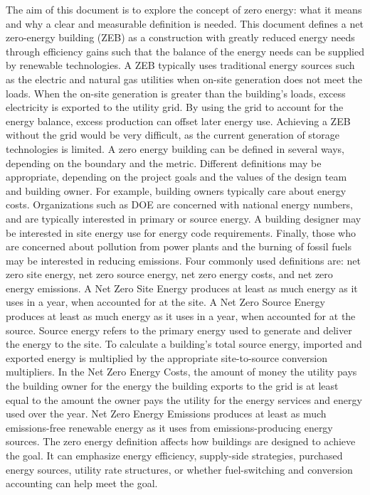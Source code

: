 The aim of this document is to explore the concept of zero energy: what it means and why a clear and measurable definition is needed. This document defines a net zero-energy building (ZEB) as a construction with greatly reduced energy needs through efficiency gains such that the balance of the energy needs can be supplied by renewable technologies. A ZEB typically uses traditional energy sources such as the electric and natural gas utilities when on-site generation does not meet the loads. When the on-site generation is greater than the building’s loads, excess electricity is exported to the utility grid. By using the grid to account for the energy balance, excess production can offset later energy use. Achieving a ZEB without the grid would be very difficult, as the current generation of storage technologies is limited. A zero energy building can be defined in several ways, depending on the boundary and the metric. Different definitions may be appropriate, depending on the project goals and the values of the design team and building owner. For example, building owners typically care about energy costs. Organizations such as DOE are concerned with national energy numbers, and are typically interested in primary or source energy. A building designer may be interested in site energy use for energy code requirements. Finally, those who are concerned about pollution from power plants and the burning of fossil fuels may be interested in reducing emissions. Four commonly used definitions are: net zero site energy, net zero source energy, net zero energy costs, and net zero energy emissions. A Net Zero Site Energy produces at least as much energy as it uses in a year, when accounted for at the site. A Net Zero Source Energy produces at least as much energy as it uses in a year, when accounted for at the source. Source energy refers to the primary energy used to generate and deliver the energy to the site. To calculate a building’s total source energy, imported and exported energy is multiplied by the appropriate site-to-source conversion multipliers. In the Net Zero Energy Costs, the amount of money the utility pays the building owner for the energy the building exports to the grid is at least equal to the amount the owner pays the utility for the energy services and energy used over the year. Net Zero Energy Emissions produces at least as much emissions-free renewable energy as it uses from emissions-producing energy sources. The zero energy definition affects how buildings are designed to achieve the goal. It can
emphasize energy efficiency, supply-side strategies, purchased energy sources, utility rate
structures, or whether fuel-switching and conversion accounting can help meet the goal.

